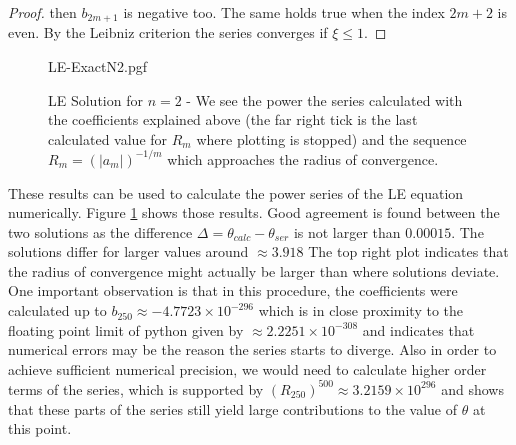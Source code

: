 \begin{appendix}
\begin{section}
\begin{proof}
	then $b_{2m+1}$ is negative too. The same holds true when the index $2m+2$ is even.
	By the Leibniz criterion the series converges if $\xi\leq1$. 
\end{proof}
\begin{figure}[H]
	{LE-ExactN2.pgf}
	\caption[LE Solution for $n=2$]{LE Solution for $n=2$ - We see the power 
	the series calculated with the coefficients explained above (the far right tick is the 
	last calculated value for $R_m$ where plotting is stopped) and 
	the sequence $R_m=(|a_m|)^{-1/m}$ which approaches the radius of convergence.
	}
	\label{5-MoExSo-LEN2-Plot}
\end{figure}\noindent
These results can be used to calculate the power series of the LE equation numerically. 
Figure \ref{5-MoExSo-LEN2-Plot} shows those results. Good agreement is found between the two solutions 
as the difference $\Delta=\theta_{calc}-\theta_{ser}$ is not larger than $0.00015$.
The solutions differ for larger values around $\approx3.918$
The top right plot indicates that the radius of convergence might actually be larger than 
where solutions deviate. 
One important observation is that in this procedure, 
the coefficients were calculated up to $b_{250}\approx-4.7723\times10^{-296}$ which is in close 
proximity to the floating point limit of python given by $\approx2.2251\times10^{-308}$ and 
indicates that numerical errors may be the reason the series starts to diverge. 
Also in order to achieve sufficient numerical precision, we would need to calculate higher 
order terms of the series, which is supported by $(R_{250})^{500}\approx3.2159\times10^{296}$ and shows
that these parts of the series still yield large contributions to the value of $\theta$ at this point.
%
%
%

\end{section}
\end{appendix}
